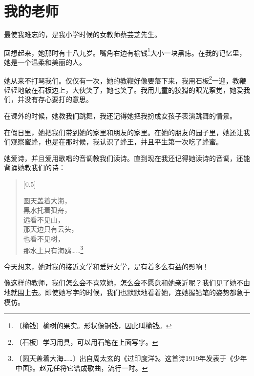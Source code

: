\documentclass[12pt,UTF-8,openany]{ctexbook}
\begin{document}
\chapter{我的老师}

\begin{normalsize}
    
    最使我难忘的，是我小学时候的女教师蔡芸芝先生。
    
    回想起来，她那时有十八九岁。嘴角右边有榆钱\footnote{〔榆钱〕榆树的果实。形状像铜钱，因此叫榆钱。}大小一块黑痣。在我的记忆里，她是一个温柔和美丽的人。
    
    她从来不打骂我们。仅仅有一次，她的教鞭好像要落下来，我用石板\footnote{〔石板〕学习用具，可以用石笔在上面写字。}一迎，教鞭轻轻地敲在石板边上，大伙笑了，她也笑了。我用儿童的狡猾的眼光察觉，她爱我们，并没有存心要打的意思。
    
    在课外的时候，她教我们跳舞，我还记得她把我扮成女孩子表演跳舞的情景。
    
    在假日里，她把我们带到她的家里和朋友的家里。在她的朋友的园子里，她还让我们观察蜜蜂，也是在那时候，我认识了蜂王，并且平生第一次吃了蜂蜜。
    
    她爱诗，并且爱用歌唱的音调教我们读诗。直到现在我还记得她读诗的音调，还能背诵她教我们的诗：
    
    \begin{verse}[0.5\linewidth]
    
    圆天盖着大海，\\
    
    黑水托着孤舟，\\
    
    远看不见山，\\
    
    那天边只有云头，\\
    
    也看不见树，\\
    
    那水上只有海鸥……\footnote{〔圆天盖着大海……〕出自周太玄的《过印度洋》。这首诗1919年发表于《少年中国》。赵元任将它谱成歌曲，流行一时。}\\
    
    \end{verse}
    
    今天想来，她对我的接近文学和爱好文学，是有着多么有益的影响！
    
    像这样的教师，我们怎么会不喜欢她，怎么会不愿意和她亲近呢？我们见了她不由地就围上去。即使她写字的时候，我们也默默地看着她，连她握铅笔的姿势都急于模仿。
    

\end{normalsize}
\end{document}
